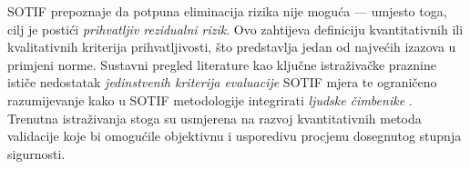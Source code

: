 SOTIF prepoznaje da potpuna eliminacija rizika nije moguća — umjesto toga, cilj je postići \textit{prihvatljiv rezidualni rizik}. Ovo zahtijeva definiciju kvantitativnih ili kvalitativnih kriterija prihvatljivosti, što predstavlja jedan od najvećih izazova u primjeni norme. Sustavni pregled literature kao ključne istraživačke praznine ističe nedostatak \textit{jedinstvenih kriterija evaluacije} SOTIF mjera te ograničeno razumijevanje kako u SOTIF metodologije integrirati \textit{ljudske čimbenike} \cite{patel2025sotifslr}. Trenutna istraživanja stoga su usmjerena na razvoj kvantitativnih metoda validacije koje bi omogućile objektivnu i usporedivu procjenu dosegnutog stupnja sigurnosti.
